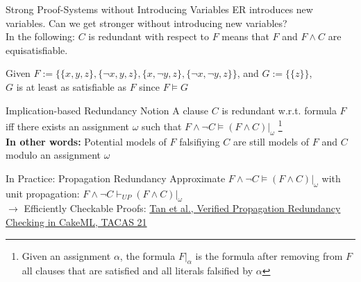 \documentclass[t]{sdqbeamer}
\begin{document}
\begin{frame}{Strong Proof-Systems without Introducing Variables}
\vspace*{-1em}
ER introduces new variables. Can we get stronger without introducing new variables?\\
In the following: $C$ is redundant with respect to $F$ means that $F$ and $F \land C$ are equisatisfiable.
\begin{example}
Given $F := \{\{x, y, z\}, \{\lnot x, y, z\}, \{x, \lnot y, z\}, \{\lnot x, \lnot y, z\}\}$, and $G := \{\{z\}\}$, \\
$G$ is at least as satisfiable as $F$ since $F \models G$
\end{example}
\pause
\begin{block}{Implication-based Redundancy Notion}
A clause $C$ is redundant w.r.t. formula $F$ iff there exists an assignment $\omega$ such that $F \land \lnot C \models (F \land C)|_\omega$%
\footnote{Given an assignment $\alpha$, the formula $F|_\alpha$ is the formula after removing from $F$ all clauses that are satisfied and all literals falsified by $\alpha$}
~\\[1ex]
\textbf{In other words:} Potential models of $F$ falsifiying $C$ are still models of $F$ and $C$ modulo an assignment $\omega$
\end{block}
\pause
\begin{block}{In Practice: Propagation Redundancy}
Approximate $F \land \lnot C \models (F \land C)|_\omega$ with unit propagation: $F \land \lnot C \vdash_{UP} (F \land C)|_\omega$\\
$\rightarrow$ Efficiently Checkable Proofs: \href{https://cakeml.org/tacas21.pdf}{Tan et al., Verified Propagation Redundancy Checking in CakeML, TACAS 21}
\end{block}
\end{frame}
\end{document}

